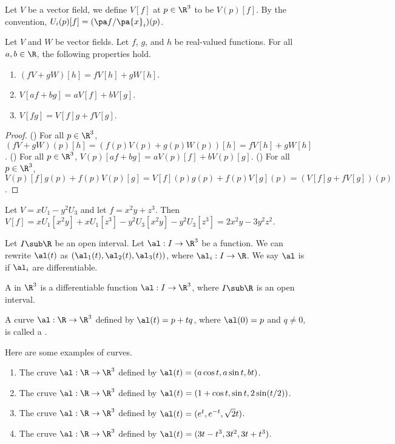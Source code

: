\documentclass[10pt]{article}
\begin{document}
\par
Let $V$ be a vector field, we define $V[f]$ at $p\in{\R}^{3}$ to be $V(p)[f]$. By the convention, ${U}_{i}(p)[f]=(\pa f/\pa{x}_{i})(p)$.
\begin{proposition}
    Let $V$ and $W$ be vector fields. Let $f$, $g$, and $h$ be real-valued functions. For all $a,b\in\R$, the following properties hold.
    \begin{enumerate}
        \item $(fV+gW)[h]=fV[h]+gW[h]$.
        \item $V[af+bg]=aV[f]+bV[g]$.
        \item $V[fg]=V[f]g+fV[g]$.
    \end{enumerate}
\end{proposition}
\begin{proof}
    () For all $p\in{\R}^{3}$, $(fV+gW)(p)[h]=(f(p)V(p)+g(p)W(p))[h]=fV[h]+gW[h]$. () For all $p\in{\R}^{3}$, $V(p)[af+bg]=aV(p)[f]+bV(p)[g]$. () For all $p\in{\R}^{3}$, $V(p)[f]g(p)+f(p)V(p)[g]=V[f](p)g(p)+f(p)V[g](p)=(V[f]g+fV[g])(p)$.
\end{proof}
\begin{example}
    Let $V=x{U}_{1}-{y}^{2}{U}_{3}$ and let $f={x}^{2}y+{z}^{3}$. Then $V[f]=x{U}_{1}[{x}^{2}y]+x{U}_{1}[{z}^{3}]-{y}^{2}{U}_{3}[{x}^{2}y]-{y}^{2}{U}_{3}[{z}^{3}]=2{x}^{2}y-3{y}^{2}{z}^{2}$.
\end{example}
\par
Let $I\sub\R$ be an open interval. Let $\al:I\to{\R}^{3}$ be a function. We can rewrite $\al(t)$ as $({\al}_{1}(t),{\al}_{2}(t),{\al}_{3}(t))$, where ${\al}_{i}:I\to\R$. We say $\al$ is  if ${\al}_{i}$ are differentiable.
\begin{definition}
    A  in ${\R}^{3}$ is a differentiable function $\al:I\to{\R}^{3}$, where $I\sub\R$ is an open interval.
\end{definition}
\begin{example}
    A curve $\al:\R\to{\R}^{3}$ defined by $\al(t)=p+tq$, where $\al(0)=p$ and $q\ne 0$, is called a .
\end{example}
\begin{example}
    Here are some examples of curves.
    \begin{enumerate}
        \item The cruve $\al:\R\to{\R}^{3}$ defined by $\al(t)=(a\cos t,a\sin t,bt)$.
        \item The cruve $\al:\R\to{\R}^{3}$ defined by $\al(t)=(1+\cos t,\sin t,2\sin(t/2))$.
        \item The cruve $\al:\R\to{\R}^{3}$ defined by $\al(t)=({e}^{t},{e}^{-t},\sqrt{2}t)$.
        \item The cruve $\al:\R\to{\R}^{3}$ defined by $\al(t)=(3t-{t}^{3},3{t}^{2},3t+{t}^{3})$.
    \end{enumerate}
\end{example}
\end{document}
